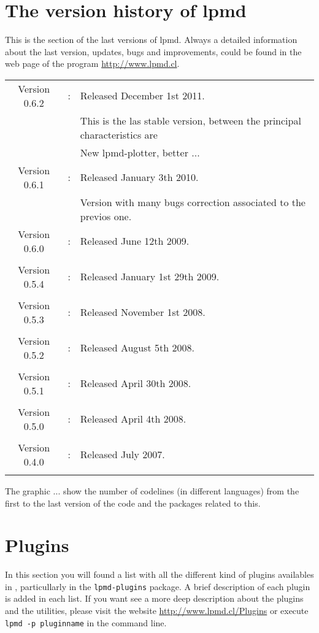 \appendix

\chapter{The version history of lpmd}
\label{lpmd-versions}
This is the section of the last versions of lpmd. Always a detailed information
about the last version, updates, bugs and improvements, could be found in the
web page of the program \url{http://www.lpmd.cl}.

\begin{tabular}{ccl}\\
 Version 0.6.2 &:& Released December 1st 2011.\\
 && This is the las stable version, between the principal characteristics are\\
 && New lpmd-plotter, better ...\\
 Version 0.6.1 &:& Released January 3th 2010.\\
 && Version with many bugs correction associated to the previos one.\\
 Version 0.6.0 &:& Released June 12th 2009.\\
 &&\\
 Version 0.5.4 &:& Released January 1st 29th 2009.\\
 &&\\
 Version 0.5.3 &:& Released November 1st 2008.\\
 &&\\
 Version 0.5.2 &:& Released August 5th 2008.\\
 &&\\
 Version 0.5.1 &:& Released April 30th 2008.\\
 &&\\
 Version 0.5.0 &:& Released April 4th 2008.\\
 &&\\
 Version 0.4.0 &:& Released July 2007.\\
 &&\\
\end{tabular}

The graphic ... show the number of codelines (in different languages) from the
first to the last version of the code and the packages related to this.

\chapter{Plugins}
In this section you will found a list with all the different kind of plugins
availables in {\lpmd}, particullarly in the \texttt{lpmd-plugins} package. A
brief description of each plugin is added in each list. If you want see a more
deep description about the plugins and the utilities, please visit the website
\url{http://www.lpmd.cl/Plugins} or execute \verb|lpmd -p pluginname| in the
command line.

